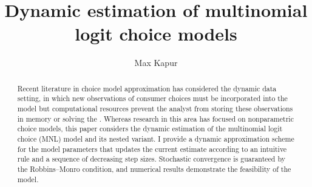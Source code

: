 \documentclass[preprint,12pt,authoryear]{elsarticle}
\begin{document}
\begin{frontmatter}


 \title{Dynamic estimation of multinomial logit choice models}
 \author{Max Kapur}

\title{}


\author{}


\begin{abstract}
Recent literature in choice model approximation has considered the dynamic data setting, in which new observations of consumer choices must be incorporated into the model but computational resources prevent the analyst from storing these observations in memory or solving the . Whereas research in this area has focused on nonparametric choice models, this paper considers the dynamic estimation of the multinomial logit choice (MNL) model and its nested variant. I provide a dynamic approximation scheme for the model parameters that updates the current estimate according to an intuitive rule and a sequence of decreasing step sizes. Stochastic convergence is guaranteed by the Robbins--Monro condition, and numerical results demonstrate the feasibility of the model.
\end{abstract}


\end{frontmatter}
\end{document}
